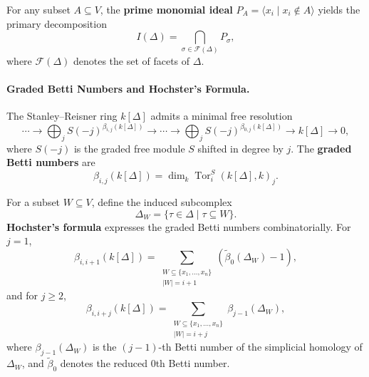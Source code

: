 \documentclass[10pt,twocolumn]{article}
\DeclareMathOperator{\Tor}{Tor}
\begin{document}
For any subset $A \subseteq V$, the \textbf{prime monomial ideal}
$P_A = \langle x_i \mid x_i \notin A \rangle$ yields the primary decomposition
\begin{equation}
I(\Delta) = \bigcap_{\sigma \in \mathcal{F}(\Delta)} P_\sigma,
\label{eq:primary}
\end{equation}
where $\mathcal{F}(\Delta)$ denotes the set of facets of $\Delta$.

\paragraph{Graded Betti Numbers and Hochster's Formula.}
The Stanley--Reisner ring $k[\Delta]$ admits a minimal free resolution
\begin{equation}
\cdots \to \bigoplus_j S(-j)^{\beta_{i,j}(k[\Delta])} \to \cdots
       \to \bigoplus_j S(-j)^{\beta_{0,j}(k[\Delta])} \to k[\Delta] \to 0,
\label{eq:resolution}
\end{equation}
where $S(-j)$ is the graded free module $S$ shifted in degree by $j$.
The \textbf{graded Betti numbers} are
\begin{equation}
\beta_{i,j}(k[\Delta]) = \dim_k \Tor_i^S(k[\Delta],k)_j.
\label{eq:betti}
\end{equation}

For a subset $W \subseteq V$, define the induced subcomplex
\begin{equation}
\Delta_W = \{\tau \in \Delta \mid \tau \subseteq W\}.
\label{eq:induced}
\end{equation}
\textbf{Hochster's formula} expresses the graded Betti numbers combinatorially.
For $j = 1$,
\begin{equation}
\beta_{i,i+1}(k[\Delta]) = \sum_{\substack{W \subseteq \{x_1,\ldots,x_n\} \\ |W|=i+1}}
                             (\tilde{\beta}_0(\Delta_W) - 1),
\label{eq:hochster1}
\end{equation}
and for $j \geq 2$,
\begin{equation}
\beta_{i,i+j}(k[\Delta]) = \sum_{\substack{W \subseteq \{x_1,\ldots,x_n\} \\ |W|=i+j}}
                             \beta_{j-1}(\Delta_W),
\label{eq:hochster2}
\end{equation}
where $\beta_{j-1}(\Delta_W)$ is the $(j-1)$-th Betti number of the simplicial homology
of $\Delta_W$, and $\tilde{\beta}_0$ denotes the reduced 0th Betti number.
\end{document}
